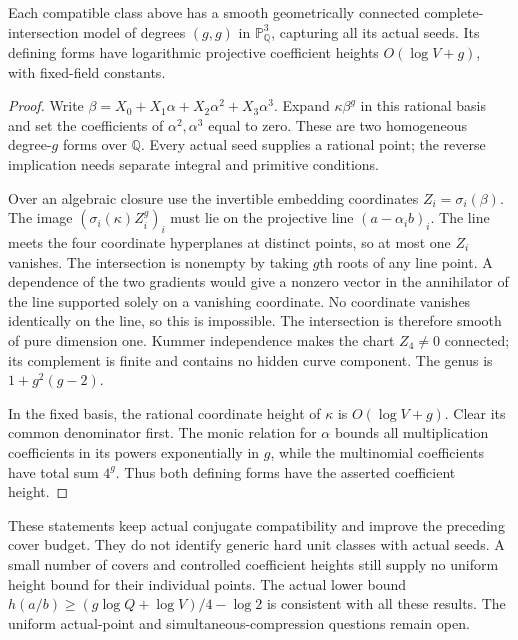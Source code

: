 \begin{theorem}
Each compatible class above has a smooth geometrically connected
complete-intersection model of degrees $(g,g)$ in $\mathbb P^3_{\mathbb Q}$,
capturing all its actual seeds. Its defining forms have logarithmic
projective coefficient heights $O(\log V+g)$, with fixed-field constants.
\end{theorem}
\begin{proof}
Write $\beta=X_0+X_1\alpha+X_2\alpha^2+X_3\alpha^3$. Expand
$\kappa\beta^g$ in this rational basis and set the coefficients of
$\alpha^2,\alpha^3$ equal to zero. These are two homogeneous degree-$g$
forms over $\mathbb Q$. Every actual seed supplies a rational point;
the reverse implication needs separate integral and primitive conditions.

Over an algebraic closure use the invertible embedding coordinates
$Z_i=\sigma_i(\beta)$. The image
$(\sigma_i(\kappa)Z_i^g)_i$ must lie on the projective line
$(a-\alpha_i b)_i$. The line meets the four coordinate hyperplanes at
distinct points, so at most one $Z_i$ vanishes. The intersection is
nonempty by taking $g$th roots of any line point. A dependence of the
two gradients would give a nonzero vector in the annihilator of the
line supported solely on a vanishing coordinate. No coordinate vanishes
identically on the line, so this is impossible. The intersection is
therefore smooth of pure dimension one. Kummer independence makes the
chart $Z_4\ne0$ connected; its complement is finite and contains no
hidden curve component. The genus is $1+g^2(g-2)$.

In the fixed basis, the rational coordinate height of $\kappa$ is
$O(\log V+g)$. Clear its common denominator first. The monic relation
for $\alpha$ bounds all multiplication coefficients in its powers
exponentially in $g$, while the multinomial coefficients have total
sum $4^g$. Thus both defining forms have the asserted coefficient height.
\end{proof}

These statements keep actual conjugate compatibility and improve the
preceding cover budget. They do not identify generic hard unit classes
with actual seeds. A small number of covers and controlled coefficient
heights still supply no uniform height bound for their individual points.
The actual lower bound
$h(a/b)\ge(g\log Q+\log V)/4-\log2$ is consistent with all these results.
The uniform actual-point and simultaneous-compression questions remain open.
